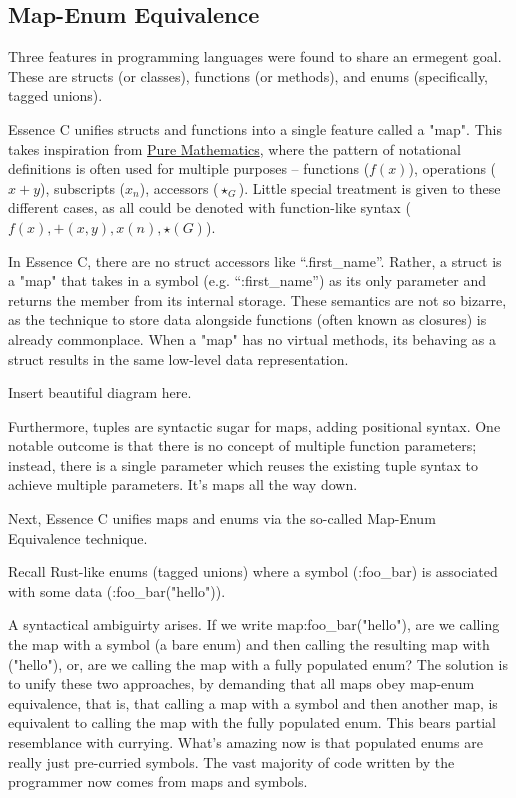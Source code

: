 \documentclass[12pt,a4paper,twoside]{report}
\begin{document}
\subsection{Map-Enum Equivalence}

Three features in programming languages were found to share an ermegent goal. These are structs (or classes), functions (or methods), and enums (specifically, tagged unions).

Essence C unifies structs and functions into a single feature called a "map". This takes inspiration from \href{https://en.wikipedia.org/wiki/Pure_mathematics}{Pure Mathematics}, where the pattern of notational definitions is often used for multiple purposes -- functions ($f(x)$), operations ($x + y$), subscripts ($x_n$), accessors ($\star_G$). Little special treatment is given to these different cases, as all could be denoted with function-like syntax ($f(x), +(x,y), x(n), \star(G)$).

In Essence C, there are no struct accessors like ``.first\_name''. Rather, a struct is a "map" that takes in a symbol (e.g. ``:first\_name'') as its only parameter and returns the member from its internal storage. These semantics are not so bizarre, as the technique to store data alongside functions (often known as closures) is already commonplace. When a "map" has no virtual methods, its behaving as a struct results in the same low-level data representation. 

Insert beautiful diagram here.

Furthermore, tuples are syntactic sugar for maps, adding positional syntax. One notable outcome is that there is no concept of multiple function parameters; instead, there is a single parameter which reuses the existing tuple syntax to achieve multiple parameters. It's maps all the way down.

Next, Essence C unifies maps and enums via the so-called Map-Enum Equivalence technique.

Recall Rust-like enums (tagged unions) where a symbol (:foo\_bar) is associated with some data (:foo\_bar("hello")).

A syntactical ambiguirty arises. If we write map:foo\_bar("hello"), are we calling the map with a symbol (a bare enum) and then calling the resulting map with ("hello"), or, are we calling the map with a fully populated enum? The solution is to unify these two approaches, by demanding that all maps obey map-enum equivalence, that is, that calling a map with a symbol and then another map, is equivalent to calling the map with the fully populated enum. This bears partial resemblance with currying. What's amazing now is that populated enums are really just pre-curried symbols. The vast majority of code written by the programmer now comes from maps and symbols.
\end{document}
